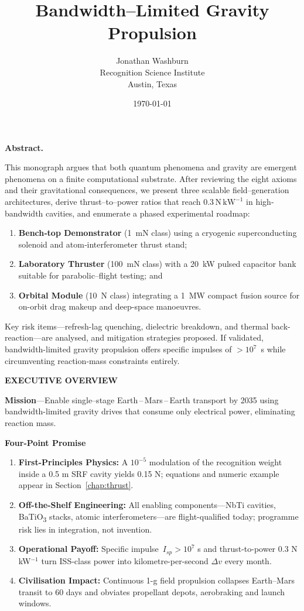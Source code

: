 \documentclass[12pt,letterpaper]{book}
\title{Bandwidth--Limited Gravity Propulsion}
\author{Jonathan Washburn\\Recognition Science Institute\\Austin, Texas}
\date{\today}
\newenvironment{abstract}{%
  \quotation
  \noindent\textbf{Abstract.}\space
}{%
  \endquotation
}
\begin{document}
\maketitle

\begin{abstract}
This monograph argues that both quantum phenomena and gravity are emergent phenomena on a finite computational substrate.  After reviewing the eight axioms and their gravitational consequences, we present three scalable field–generation architectures, derive thrust–to–power ratios that reach $0.3\,\mathrm{N\,kW^{-1}}$ in high‐bandwidth cavities, and enumerate a phased experimental roadmap:
\begin{enumerate}
  \item \textbf{Bench‐top Demonstrator} (1~mN class) using a cryogenic superconducting solenoid and atom‐interferometer thrust stand;
  \item \textbf{Laboratory Thruster} (100~mN class) with a 20~kW pulsed capacitor bank suitable for parabolic–flight testing; and
  \item \textbf{Orbital Module} (10~N class) integrating a 1~MW compact fusion source for on-orbit drag makeup and deep-space manoeuvres.
\end{enumerate}
Key risk items—refresh-lag quenching, dielectric breakdown, and thermal back-reaction—are analysed, and mitigation strategies proposed.  If validated, bandwidth-limited gravity propulsion offers specific impulses of $>10^7$~s while circumventing reaction‐mass constraints entirely.
\end{abstract}

\begin{center}\large\bfseries EXECUTIVE OVERVIEW\end{center}

\noindent\textbf{Mission}\;—Enable single–stage Earth\,–\,Mars\,–\,Earth transport by 2035 using bandwidth-limited gravity drives that consume only electrical power, eliminating reaction mass.

\noindent\textbf{Four-Point Promise}
\begin{enumerate}
  \item \textbf{First-Principles Physics:} A $10^{-5}$ modulation of the recognition weight inside a 0.5 m SRF cavity yields 0.15 N; equations and numeric example appear in Section~\ref{chap:thrust}.
  \item \textbf{Off-the-Shelf Engineering:} All enabling components—NbTi cavities, BaTiO\textsubscript{3} stacks, atomic interferometers—are flight-qualified today; programme risk lies in integration, not invention.
  \item \textbf{Operational Payoff:} Specific impulse $\,I_{sp}>10^{7}$ s and thrust-to-power 0.3 N kW$^{-1}$ turn ISS-class power into kilometre-per-second \(\Delta v\) every month.
  \item \textbf{Civilisation Impact:} Continuous 1-g field propulsion collapses Earth–Mars transit to 60 days and obviates propellant depots, aerobraking and launch windows.
\end{enumerate}
\end{document}
